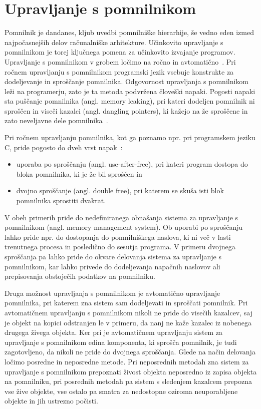 \section{Upravljanje s pomnilnikom}

Pomnilnik je dandanes, kljub uvedbi pomnilniške hierarhije, še vedno eden izmed najpočasnejših delov računalniške arhitekture. Učinkovito upravljanje s pomnilnikom je torej ključnega pomena za učinkovito izvajanje programov. Upravljanje s pomnilnikom v grobem ločimo na ročno in avtomatično~\cite{jones2023garbage}. Pri ročnem upravljanju s pomnilnikom programski jezik vsebuje konstrukte za dodeljevanje in sproščanje pomnilnika. Odgovornost upravljanja s pomnilnikom leži na programerju, zato je ta metoda podvržena človeški napaki. Pogosti napaki sta puščanje pomnilnika (angl. memory leaking), pri kateri dodeljen pomnilnik ni sproščen in viseči kazalci (angl. dangling pointers), ki kažejo na že sproščene in zato neveljavne dele pomnilnika~\cite{jones2023garbage}.

Pri ročnem upravljanju pomnilnika, kot ga poznamo npr. pri programskem jeziku C, pride pogosto do dveh vrst napak~\cite{jones2023garbage}:

\begin{itemize}
	\itemsep 0em
	\item uporaba po sproščanju (angl. use-after-free), pri kateri program dostopa do bloka pomnilnika, ki je že bil sproščen in
	\item dvojno sproščanje (angl. double free), pri katerem se skuša isti blok pomnilnika sprostiti dvakrat.
\end{itemize}

V obeh primerih pride do nedefiniranega obnašanja sistema za upravljanje s pomnilnikom (angl. memory management system). Ob uporabi po sproščanju lahko pride npr. do dostopanja do pomnilniškega naslova, ki ni več v lasti trenutnega procesa in posledično do sesutja programa. V primeru dvojnega sproščanja pa lahko pride do okvare delovanja sistema za upravljanje s pomnilnikom, kar lahko privede do dodeljevanja napačnih naslovov ali prepisovanja obstoječih podatkov na pomnilniku.

Druga možnost upravljanja s pomnilnikom je avtomatično upravljanje pomnilnika, pri katerem zna sistem sam dodeljevati in sproščati pomnilnik. Pri avtomatičnem upravljanju s pomnilnikom nikoli ne pride do visečih kazalcev, saj je objekt na kopici odstranjen le v primeru, da nanj ne kaže kazalec iz nobenega drugega živega objekta. Ker pri je avtomatičnem upravljanju sistem za upravljanje s pomnilnikom edina komponenta, ki sprošča pomnilnik, je tudi zagotovljeno, da nikoli ne pride do dvojnega sproščanja. Glede na način delovanja ločimo posredne in neposredne metode. Pri neposrednih metodah zna sistem za upravljanje s pomnilnikom prepoznati živost objekta neposredno iz zapisa objekta na pomnilniku, pri posrednih metodah pa sistem s sledenjem kazalcem prepozna vse žive objekte, vse ostalo pa smatra za nedostopne oziroma neuporabljene objekte in jih ustrezno počisti.

